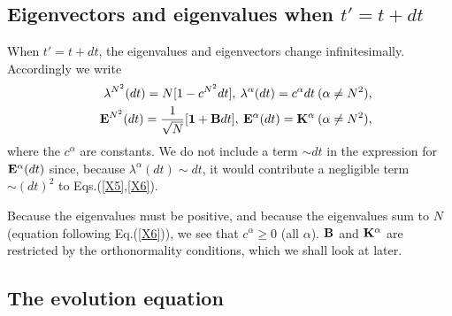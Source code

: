 \documentclass[aps,pra,amssymb, amsfonts,amsmath,showpacs, superscriptaddress,12pt]{revtex4}
\begin{document}
\subsection{Eigenvectors and eigenvalues when $t'=t+dt$}
	
	  When $t'=t+dt$,  the eigenvalues and eigenvectors change infinitesimally.  Accordingly we write
\begin{eqnarray}\label{19}
 &&\lambda^{N^{2}}(dt)=N[1-c^{N^{2}}dt], \medspace \lambda ^{\alpha}(dt)=c^{\alpha}dt \medspace(\alpha\neq N^{2}),\nonumber\\
 &&{\bf E}^{N^{2}}(dt)=\frac{1}{\sqrt{N}}[{\bf1}+{\bf B}dt], \medspace {\bf E}^{\alpha}(dt)= {\bf K}^{\alpha} \medspace(\alpha\neq N^{2}),\nonumber\\
\end{eqnarray}
 \noindent where the $c^{\alpha}$ are constants. We do not  include a term $\sim dt$ in the expression for ${\bf E}^{\alpha}(dt)$ since, because $\lambda ^{\alpha}(dt)\sim dt$, it would 
 contribute a negligible term $\sim (dt)^{2}$ to  Eqs.(\ref{X5},\ref{X6}).
 
 Because the eigenvalues must be positive, and because the eigenvalues sum to $N$ (equation following Eq.(\ref{X6})), we see that $c^{\alpha}\geq0$ (all $\alpha$).  
  ${\bf B}$ and ${\bf K}^{\alpha}$ are restricted by the orthonormality conditions, which we shall look at later.
  
  \subsection{The evolution equation}
  
\end{document}
